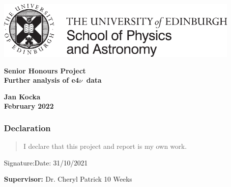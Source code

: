 \documentclass[a4paper,12pt]{article}
\newcommand{\efn}{e4$\nu$}
\begin{document}
\pagestyle{empty}
\par\noindent\includegraphics[width=12cm]{PandA_crest.pdf}
\par\noindent

\vspace*{2cm}

\begin{center}
        \Large\bf \Large\bf Senior Honours Project \\
        \LARGE\bf Further analysis of \efn\ data
\end{center}

\vspace*{0.5cm}

\begin{center}
        \bf Jan Kocka \\
        February 2022
\end{center}
\vspace*{5mm}

\begin{abstract}
    In this project we continue the work on data from \efn.
    We further inspect the data generated with GENIE, mainly looking at the events producing 1 pion and comparing then to data from the CLAS experiment.
\end{abstract}

\vspace*{1cm}

\subsubsection*{Declaration}

\begin{quotation}
  I declare that this project and report is my own work.
\end{quotation}

\vspace*{2cm}
Signature:\hspace*{8cm}Date:  31/10/2021

\vfill
{\bf Supervisor:} Dr. Cheryl Patrick
\hfill
10 Weeks
\newpage

\tableofcontents

\newpage
\end{document}
